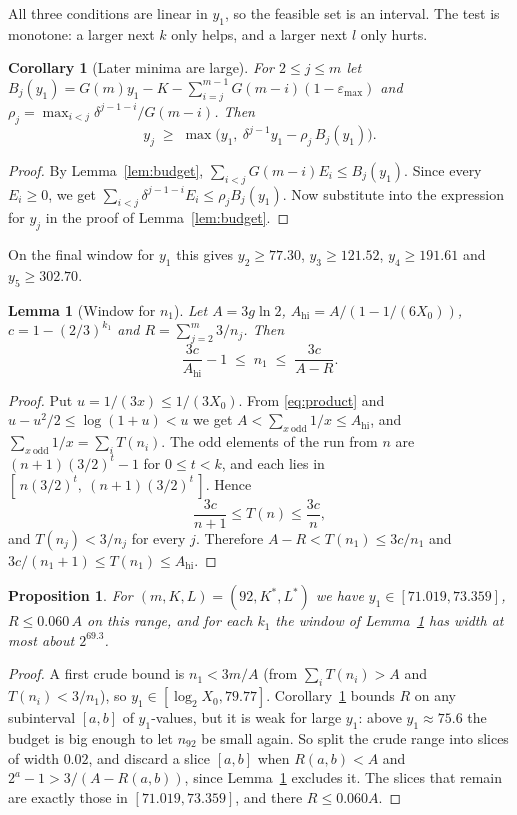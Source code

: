\documentclass[11pt]{amsart}
\newtheorem{lemma}[theorem]{Lemma}
\newtheorem{proposition}[theorem]{Proposition}
\newtheorem{corollary}[theorem]{Corollary}
\theoremstyle{definition}
\theoremstyle{remark}
\newcommand{\Kst}{K^{*}}
\newcommand{\Lst}{L^{*}}
\newcommand{\epsmax}{\varepsilon_{\max}}
\newcommand{\Ahi}{A_{\mathrm{hi}}}
\begin{document}
All three conditions are linear in $y_1$, so the feasible set is an interval. The test is monotone:
a larger next $k$ only helps, and a larger next $l$ only hurts.

\begin{corollary}[Later minima are large]\label{cor:later}
For $2 \le j \le m$ let
$B_j(y_1) = G(m)y_1 - K - \sum_{i=j}^{m-1}G(m-i)(1-\epsmax)$ and
$\rho_j = \max_{i<j}\delta^{j-1-i}/G(m-i)$. Then
\[
  y_j \;\ge\; \max\!\big(y_1,\ \delta^{j-1}y_1 - \rho_j\, B_j(y_1)\big).
\]
\end{corollary}

\begin{proof}
By Lemma~\ref{lem:budget}, $\sum_{i<j}G(m-i)E_i \le B_j(y_1)$. Since every $E_i \ge 0$, we get
$\sum_{i<j}\delta^{j-1-i}E_i \le \rho_j B_j(y_1)$. Now substitute into the expression for $y_j$ in the
proof of Lemma~\ref{lem:budget}.
\end{proof}

On the final window for $y_1$ this gives $y_2 \ge 77.30$, $y_3 \ge 121.52$, $y_4 \ge 191.61$ and
$y_5 \ge 302.70$.

\begin{lemma}[Window for $n_1$]\label{lem:window}
Let $A = 3g\ln 2$, $\Ahi = A/(1 - 1/(6X_0))$, $c = 1 - (2/3)^{k_1}$ and
$R = \sum_{j=2}^{m} 3/n_j$. Then
\[
  \frac{3c}{\Ahi} - 1 \;\le\; n_1 \;\le\; \frac{3c}{A - R}.
\]
\end{lemma}

\begin{proof}
Put $u = 1/(3x) \le 1/(3X_0)$. From \eqref{eq:product} and $u - u^2/2 \le \log(1+u) < u$ we get
$A < \sum_{x\ \mathrm{odd}} 1/x \le \Ahi$, and $\sum_{x\ \mathrm{odd}} 1/x = \sum_i T(n_i)$.
The odd elements of the run from $n$ are $(n+1)(3/2)^t - 1$ for $0 \le t < k$, and each lies in
$[\,n(3/2)^t,\ (n+1)(3/2)^t\,]$. Hence
\[
  \frac{3c}{n+1} \le T(n) \le \frac{3c}{n},
\]
and $T(n_j) < 3/n_j$ for every $j$. Therefore $A - R < T(n_1) \le 3c/n_1$ and
$3c/(n_1+1) \le T(n_1) \le \Ahi$.
\end{proof}

\begin{proposition}\label{prop:window}
For $(m, K, L) = (92, \Kst, \Lst)$ we have $y_1 \in [71.019, 73.359]$, $R \le 0.060\,A$ on this
range, and for each $k_1$ the window of Lemma~\ref{lem:window} has width at most about $2^{69.3}$.
\end{proposition}

\begin{proof}
A first crude bound is $n_1 < 3m/A$ (from $\sum_i T(n_i) > A$ and $T(n_i) < 3/n_1$), so
$y_1 \in [\log_2 X_0, 79.77]$. Corollary~\ref{cor:later} bounds $R$ on any subinterval $[a,b]$ of
$y_1$-values, but it is weak for large $y_1$: above $y_1 \approx 75.6$ the budget is big enough
to let $n_{92}$ be small again. So split the crude range into slices of width $0.02$, and discard
a slice $[a,b]$ when $R(a,b) < A$ and $2^{a} - 1 > 3/(A - R(a,b))$, since Lemma~\ref{lem:window}
excludes it. The slices that remain are exactly those in $[71.019, 73.359]$, and there
$R \le 0.060A$.
\end{proof}
\end{document}
